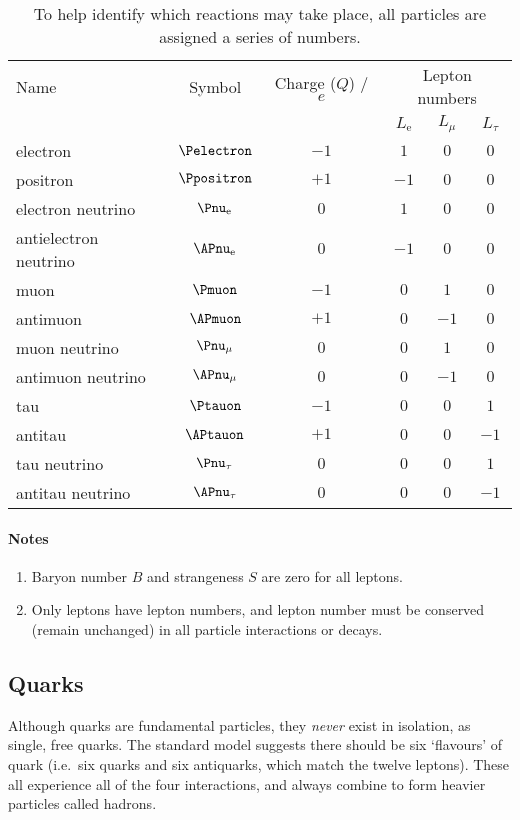 \begin{table}
  \centering
  \small\selectfont
  \begin{tabular}{lccccc}
    \toprule
    Name & Symbol & Charge ($Q$) / $e$ & \multicolumn{3}{c}{Lepton numbers}\\
    &&&$L_{\mathrm{e}}$&$L_{\mu}$&$L_{\tau}$\\
    \midrule
    electron & $\Pelectron$ & $-1$ & $1$ & $0$ & $0$\\
    positron & $\Ppositron$ & $+1$ & $-1$ & $0$ & $0$\\
    electron neutrino & $\Pnu_{\mathrm{e}}$ & $0$ & $1$ & $0$ & $0$\\
    antielectron neutrino & $\APnu_{\mathrm{e}}$ & $0$ & $-1$ & $0$ & $0$\\
    \midrule
    muon & $\Pmuon$ & $-1$ & $0$ & $1$ & $0$\\
    antimuon & $\APmuon$ & $+1$ & $0$ & $-1$ & $0$\\
    muon neutrino & $\Pnu_{\mu}$ & $0$ & $0$ & $1$ & $0$\\
    antimuon neutrino & $\APnu_{\mu}$ & $0$ & $0$ & $-1$ & $0$\\
    \midrule
    tau & $\Ptauon$ & $-1$ & $0$ & $0$ & $1$\\
    antitau & $\APtauon$ & $+1$ & $0$ & $0$ & $-1$\\
    tau neutrino & $\Pnu_{\tau}$ & $0$ & $0$ & $0$ & $1$\\
    antitau neutrino & $\APnu_{\tau}$ & $0$ & $0$ & $0$ & $-1$\\
    \bottomrule
  \end{tabular}
  \caption{To help identify which reactions may take place, all particles are assigned a series of numbers.}
\end{table}

\paragraph{Notes}\begin{enumerate}
\item Baryon number $B$ and strangeness $S$ are zero for all leptons.
\item Only leptons have lepton numbers, and lepton number must be conserved (remain unchanged) in all particle interactions or decays.
\end{enumerate}

\subsection{Quarks}
Although quarks are fundamental particles, they \emph{never} exist in isolation, as single, free quarks.  The standard model suggests there should be six `flavours' of quark (i.e.\ six quarks and six antiquarks, which match the twelve leptons).  These all experience all of the four interactions, and always combine to form heavier particles called hadrons.

